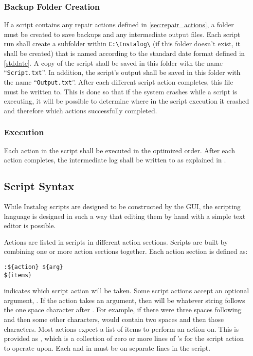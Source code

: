 \subsubsection{Backup Folder Creation} \label{sec:backup_folder}
If a script contains any repair actions defined in \ref{sec:repair_actions}, a
folder must be created to save backups and any intermediate output files.  Each
script run shall create a subfolder within \verb|C:\Instalog\| (if this folder
doesn't exist, it shall be created) that is named according to the standard date
format defined in \ref{stddate}.  A copy of the script shall be saved in this
folder with the name ``\verb|Script.txt|''.  In addition, the script's output
shall be saved in this folder with the name ``\verb|Output.txt|''.  After each
different script action completes, this file must be written to.  This is done
so that if the system crashes while a script is executing, it will be possible
to determine where in the script execution it crashed and therefore which
actions successfully completed.
\subsubsection{Execution}
Each action in the script shall be executed in the optimized order.  After each
action completes, the intermediate log shall be written to as explained in
\label{sec:backup_folder}.

\subsection{Script Syntax}
While Instalog scripts are designed to be constructed by the GUI, the scripting
language is designed in such a way that editing them by hand with a simple text
editor is possible.  

Actions are listed in scripts in different action sections.  Scripts are built
by combining one or more action sections together.  Each action section is
defined as:
\begin{verbatim}
:${action} ${arg}
${items}
\end{verbatim}
 indicates which script action will be taken.  Some script actions
accept an optional argument, .  If the action takes an argument,
then  will be whatever string follows the one space character after
.  For example, if there were three spaces following 
and then some other characters,  would contain two spaces and then
those characters.  Most actions expect a list of items to perform an action on. 
This is provided as , which is a collection of zero or more lines of
's for the script action to operate upon.  Each  and
 in  must be on separate lines in the script.

